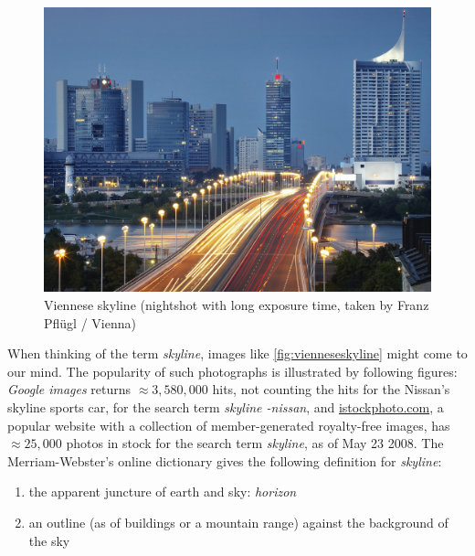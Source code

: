 \begin{figure}[htbp]
%
%
%
\centering
\includegraphics[scale=1.0]{photos/iStock_000002358169Large_100mm}%
\caption{Viennese skyline (nightshot with long exposure time, 
taken by Franz Pfl\"ugl / Vienna)}%
\label{fig:vienneseskyline}%
\end{figure}

When thinking of the term \emph{skyline}, images like 
\autoref{fig:vienneseskyline} might come to our mind.
The popularity of such photographs is illustrated by following figures:
\emph{Google images} returns $\approx 3{,}580{,}000$ hits, not
counting the hits for the Nissan's skyline sports car, for the search
term
\emph{skyline -nissan}, and 
%
\href{http://www.istockphoto.com/}{istockphoto.com}, 
a popular website with a collection of member-generated royalty-free images,
has $\approx 25{,}000$ photos in stock for the search term
\emph{skyline}, as of May 23 2008. 
The Merriam-Webster's online dictionary gives the following definition for \emph{skyline}:
\begin{enumerate}
\item the apparent juncture of earth and sky: \emph{horizon}
\item an outline (as of buildings or a mountain range) against the
background of the sky
\end{enumerate}

